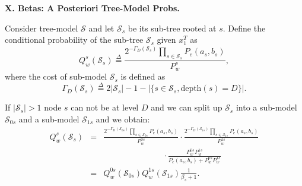 \documentclass[a4paper,landscape]{slides} %
\newcommand{\cS}{{\mathcal{S}}}
\newcommand{\define}{\stackrel{\Delta}{=}}
\newcommand{\xT}{x_{1}^{T}}
\newcommand{\GD}{{\Gamma_{D}}}
\begin{document}
\begin{slide}{\bf\Large\color{blue} X. Betas: A Posteriori Tree-Model Probs.}

Consider tree-model $\cS$ and let $\cS_{s}$ be its sub-tree rooted at $s$.
Define the conditional probability of the sub-tree $\cS_{s}$ given $\xT$ as
\begin{equation*}
Q_{w}^{s}(\cS_s) \define \frac{2^{-\GD(\cS_{s})} \prod_{s\in\cS_s} P_e( a_s,b_s) }{ P_{w}^{s} },\label{def:Qw}
\end{equation*}
where the cost of sub-model $\cS_{s}$ is defined as
\begin{equation*}
\GD(\cS_{s}) \define 2|\cS_{s}| - 1 - |\{ s\in\cS_{s}, \mbox{depth$(s) = D$} \}|. \label{def:subtreecost}
\end{equation*}

If $|\cS_s|>1$ node $s$ can not be at level $D$ and we can split up $\cS_{s}$ into a sub-model $\cS_{0s}$ and a sub-model $\cS_{1s}$ and we obtain:
\begin{eqnarray*}
Q_{w}^{s}(\cS_s) &=& \frac{ 2^{-\GD(\cS_{0s})} \prod_{s\in\cS_{0s}} P_e(a_s,b_s) } { P_{w}^{0s}}
\cdot\frac{ 2^{-\GD(\cS_{1s})} \prod_{s\in\cS_{1s}} P_e(a_s,b_s) } { P_{w}^{1s}} \nonumber \\
&&\hspace{3cm} \cdot\frac{ P_{w}^{0s} P_{w}^{1s} } { P_e(a_s,b_s)+P_{w}^{0s}P_{w}^{1s} } \nonumber \\
&=&    Q_{w}^{0s}(\cS_{0s})Q_{w}^{1s}(\cS_{1s})\frac{1}{\beta_{s}+1}.
\end{eqnarray*}
\end{slide}
\end{document}
